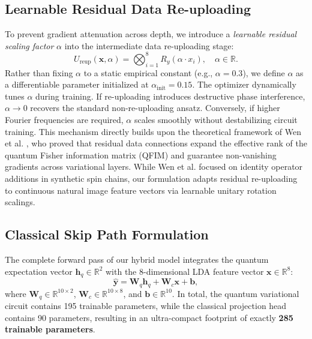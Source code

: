 \documentclass[10pt,twocolumn,twoside,a4paper]{article}
\begin{document}
\subsection{Learnable Residual Data Re-uploading}
To prevent gradient attenuation across depth, we introduce a \textit{learnable residual scaling factor} $\alpha$ into the intermediate data re-uploading stage:
\begin{equation}
    U_{\text{reup}}(\mathbf{x}, \alpha) = \bigotimes_{i=1}^8 R_y(\alpha \cdot x_i), \quad \alpha \in \mathbb{R}.
\end{equation}
Rather than fixing $\alpha$ to a static empirical constant (e.g., $\alpha=0.3$), we define $\alpha$ as a differentiable parameter initialized at $\alpha_{\text{init}} = 0.15$. The optimizer dynamically tunes $\alpha$ during training. If re-uploading introduces destructive phase interference, $\alpha \to 0$ recovers the standard non-re-uploading ansatz. Conversely, if higher Fourier frequencies are required, $\alpha$ scales smoothly without destabilizing circuit training. This mechanism directly builds upon the theoretical framework of Wen et al. \cite{wen2024enhancing}, who proved that residual data connections expand the effective rank of the quantum Fisher information matrix (QFIM) and guarantee non-vanishing gradients across variational layers. While Wen et al. \cite{wen2024enhancing} focused on identity operator additions in synthetic spin chains, our formulation adapts residual re-uploading to continuous natural image feature vectors via learnable unitary rotation scalings.

\subsection{Classical Skip Path Formulation}
The complete forward pass of our hybrid model integrates the quantum expectation vector $\mathbf{h}_q \in \mathbb{R}^2$ with the 8-dimensional LDA feature vector $\mathbf{x} \in \mathbb{R}^8$:
\begin{equation}
    \hat{\mathbf{y}} = \mathbf{W}_q \mathbf{h}_q + \mathbf{W}_c \mathbf{x} + \mathbf{b},
\end{equation}
where $\mathbf{W}_q \in \mathbb{R}^{10 \times 2}$, $\mathbf{W}_c \in \mathbb{R}^{10 \times 8}$, and $\mathbf{b} \in \mathbb{R}^{10}$. In total, the quantum variational circuit contains 195 trainable parameters, while the classical projection head contains 90 parameters, resulting in an ultra-compact footprint of exactly \textbf{285 trainable parameters}.
\end{document}
